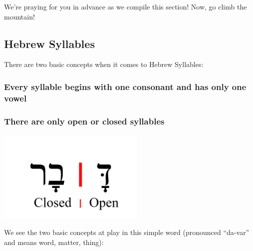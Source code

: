 \documentclass[
]{turabian-researchpaper}
\begin{document}
We're praying for you in advance as we compile this section! Now, go climb the mountain!

\hypertarget{three_1}{%
\subsection{Hebrew Syllables}\label{three_1}}

There are two basic concepts when it comes to Hebrew Syllables:

\hypertarget{every-syllable-begins-with-one-consonant-and-has-only-one-vowel}{%
\subsubsection*{Every syllable begins with one consonant and has only one vowel}\label{every-syllable-begins-with-one-consonant-and-has-only-one-vowel}}

\hypertarget{there-are-only-open-or-closed-syllables}{%
\subsubsection*{There are only open or closed syllables}\label{there-are-only-open-or-closed-syllables}}

\begin{center}\includegraphics[width=200pt]{images/03.syllable} \end{center}

We see the two basic concepts at play in this simple word (pronounced ``da-var'' and means word, matter, thing):
\end{document}
